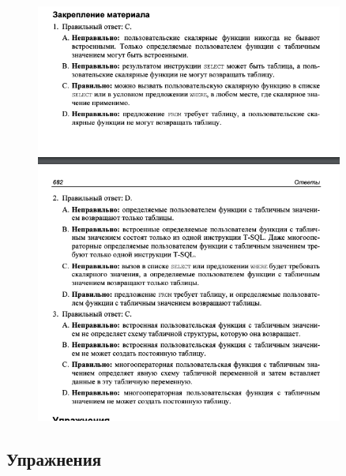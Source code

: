 \begin{figure}[h!]
	\begin{center}
		\includegraphics[width=0.9\textwidth]{img/ans32.png}
	\end{center}
	\captionsetup{justification=centering}
\end{figure}


\newpage
\subsection*{Упражнения}


